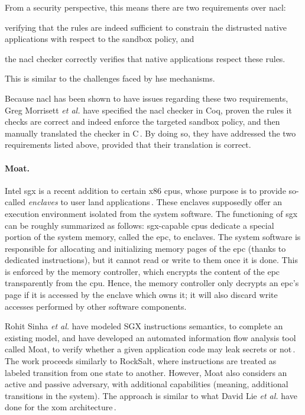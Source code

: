 From a security perspective, this means there are two requirements over
\ac{nacl}:
%
\begin{inparaenum}[(1)]
\item verifying that the rules are indeed sufficient to constrain the distrusted
  native applications with respect to the sandbox policy, and
%
\item the \ac{nacl} checker correctly verifies that native applications respect
  these rules.
\end{inparaenum}
%
This is similar to the challenges faced by \ac{hse} mechanisms.

Because \ac{nacl} has been shown to have issues regarding these two
requirements, Greg Morrisett \emph{et al.} have specified the \ac{nacl} checker
in Coq, proven the rules it checks are correct and indeed enforce the targeted
sandbox policy, and then manually translated the checker in
C\,\cite{morrisett2012rocksalt}.
%
By doing so, they have addressed the two requirements listed above, provided
that their translation is correct.

\paragraph{Moat.}
%
Intel \ac{sgx} is a recent addition to certain x86 \acp{cpu}, whose purpose is
to provide so-called \emph{enclaves} to user land
applications\,\cite{costan2016sgxexplained}.
%
These enclaves supposedly offer an execution environment isolated from the
system software.
%
The functioning of \ac{sgx} can be roughly summarized as follows:
\ac{sgx}-capable \acp{cpu} dedicate a special portion of the system memory,
called the \ac{epc}, to enclaves.
%
The system software is responsible for allocating and initializing memory pages
of the \ac{epc} (thanks to dedicated instructions), but it cannot read or write
to them once it is done.
%
This is enforced by the memory controller, which encrypts the content of the
\ac{epc} transparently from the \ac{cpu}.
%
Hence, the memory controller only decrypts an \ac{epc}'s page if it is accessed
by the enclave which owns it; it will also discard write accesses performed by
other software components.

Rohit Sinha \emph{et al.} have modeled SGX instructions semantics, to complete
an existing model, and have developed an automated information flow analysis
tool called Moat, to verify whether a given application code may leak secrets or
not\,\cite{sinha2015moat}.
%
The work proceeds similarly to RockSalt, where instructions are treated as
labeled transition from one state to another.
%
However, Moat also considers an active and passive adversary, with additional
capabilities (meaning, additional transitions in the system).
%
The approach is similar to what David Lie \emph{et al.} have done for the
\ac{xom} architecture\,\cite{lie2003xom}.

